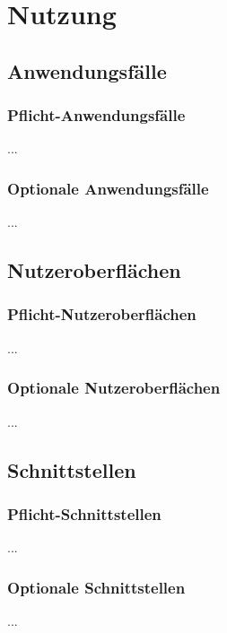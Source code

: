 %
%


\chapter{Nutzung}
\label{Nutzung}



\section{Anwendungsfälle}

\subsection*{Pflicht-Anwendungsfälle}

...
\\


\subsection*{Optionale Anwendungsfälle}

...
\\


\section{Nutzeroberflächen}

\subsection*{Pflicht-Nutzeroberflächen}

...
\\


\subsection*{Optionale Nutzeroberflächen}

...
\\


\section{Schnittstellen}

\subsection*{Pflicht-Schnittstellen}

...
\\


\subsection*{Optionale Schnittstellen}

...
\\


